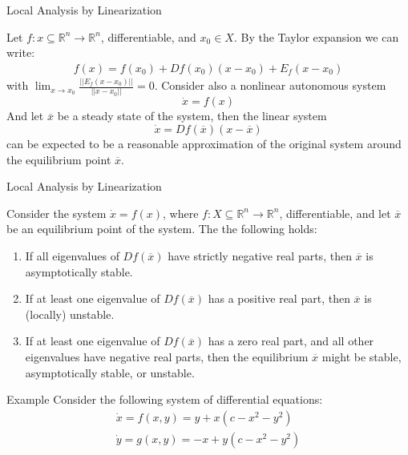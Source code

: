 \documentclass[aspectratio=169]{beamer}
\begin{document}
\begin{frame}{Local Analysis by Linearization}

Let $f:x\subseteq\mathds{R}^n\rightarrow \mathds{R}^n$, differentiable, and $x_0\in X$. By the Taylor expansion we can write:
\begin{align*}
    f(x)=f(x_0)+Df(x_0)(x-x_0)+E_f(x-x_0)
\end{align*}
    with $\lim_{x\rightarrow x_0} \frac{||E_f(x-x_0)||}{||x-x_0||} = 0$. Consider also a nonlinear autonomous system \[\dot{x}=f(x)\]
    And let $\overline{x}$ be a steady state of the system, then the linear system \[\dot{x}=Df(\overline{x})(x-\overline{x})\] can be expected to be a reasonable approximation of the original system around the equilibrium point $\overline{x}$.
\end{frame}

\begin{frame}{Local Analysis by Linearization}
\begin{theorem}
    Consider the system $\dot{x}=f(x)$, where $f:X\subseteq\mathds{R}^n\rightarrow\mathds{R}^n$, differentiable, and let $\overline{x}$ be an equilibrium point of the system. The the following holds:
    \begin{enumerate}
        \item If all eigenvalues of $Df(\overline{x})$ have strictly negative real parts, then $\overline{x}$ is asymptotically stable.
        \item If at least one eigenvalue of $Df(\overline{x})$ has a positive real part, then $\overline{x}$ is (locally) unstable.
        \item If at least one eigenvalue of $Df(\overline{x})$ has a zero real part, and all other eigenvalues have negative real parts, then the equilibrium $\overline{x}$ might be stable, asymptotically stable, or unstable.
    \end{enumerate}
\end{theorem}
    
\end{frame}

\begin{frame}{Example}
    Consider the following system of differential equations:
    \begin{align}
        \dot{x}=f(x,y)=y+x(c-x^2-y^2)\label{ex1a}\\
        \dot{y}=g(x,y)=-x+y(c-x^2-y^2)\label{ex1b}
    \end{align}
\end{frame}
\end{document}
